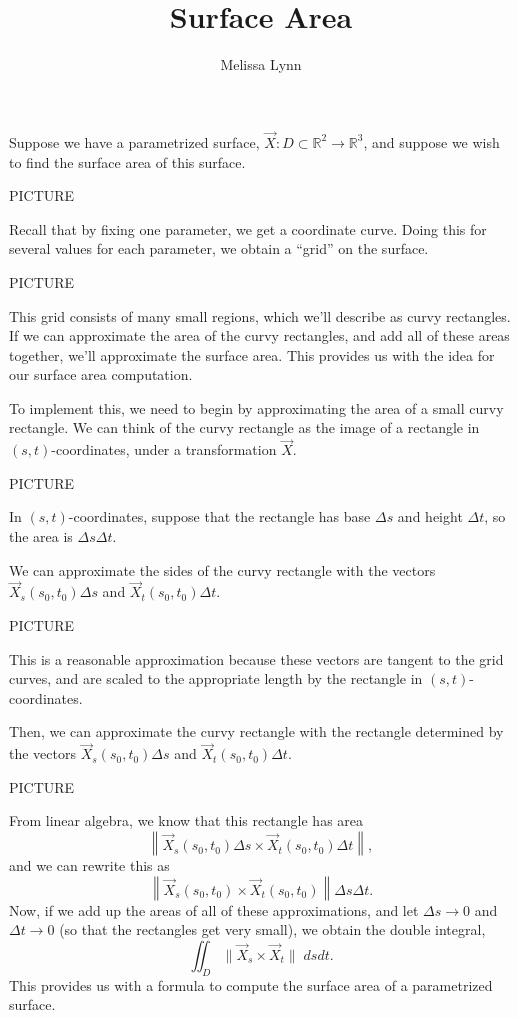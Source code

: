 \documentclass{ximera}
\title{Surface Area}
\author{Melissa Lynn}
\begin{document}
  
\begin{abstract}  
\end{abstract}  
\maketitle  

Suppose we have a parametrized surface, $\vec{X}:D\subset\mathbb{R}^2\rightarrow\mathbb{R}^3$, and suppose we wish to find the surface area of this surface.

PICTURE

Recall that by fixing one parameter, we get a coordinate curve. Doing this for several values for each parameter, we obtain a ``grid'' on the surface.

PICTURE

This grid consists of many small regions, which we'll describe as curvy rectangles. If we can approximate the area of the curvy rectangles, and add all of these areas together, we'll approximate the surface area. This provides us with the idea for our surface area computation.

To implement this, we need to begin by approximating the area of a small curvy rectangle. We can think of the curvy rectangle as the image of a rectangle in $(s,t)$-coordinates, under a transformation $\vec{X}$.

PICTURE

In $(s,t)$-coordinates, suppose that the rectangle has base $\Delta s$ and height $\Delta t$, so the area is $\Delta s\Delta t$.

We can approximate the sides of the curvy rectangle with the vectors $\vec{X}_s(s_0,t_0)\Delta s$ and $\vec{X}_t(s_0,t_0)\Delta t$.

PICTURE

This is a reasonable approximation because these vectors are tangent to the grid curves, and are scaled to the appropriate length by the rectangle in $(s,t)$-coordinates. 

Then, we can approximate the curvy rectangle with the rectangle determined by the vectors $\vec{X}_s(s_0,t_0)\Delta s$ and $\vec{X}_t(s_0,t_0)\Delta t$.

PICTURE

From linear algebra, we know that this rectangle has area 
\[
\left\|\vec{X}_s(s_0,t_0)\Delta s\times \vec{X}_t(s_0,t_0)\Delta t\right\|,
\]
and we can rewrite this as
\[
\left\|\vec{X}_s(s_0,t_0)\times \vec{X}_t(s_0,t_0)\right\|\Delta s\Delta t.
\]
Now, if we add up the areas of all of these approximations, and let $\Delta s\rightarrow 0$ and $\Delta t \rightarrow 0$ (so that the rectangles get very small), we obtain the double integral,
\[
\iint_D\|\vec{X}_s\times\vec{X}_t\|\;dsdt.
\]
This provides us with a formula to compute the surface area of a parametrized surface.
\end{document}
